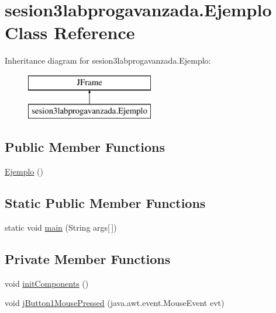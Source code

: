 \hypertarget{classsesion3labprogavanzada_1_1_ejemplo}{}\section{sesion3labprogavanzada.\+Ejemplo Class Reference}
\label{classsesion3labprogavanzada_1_1_ejemplo}
Inheritance diagram for sesion3labprogavanzada.\+Ejemplo\+:\begin{figure}[H]
\begin{center}
\leavevmode
\includegraphics[height=2.000000cm]{classsesion3labprogavanzada_1_1_ejemplo}
\end{center}
\end{figure}
\subsection*{Public Member Functions}
\begin{DoxyCompactItemize}
\item 
\mbox{\hyperlink{classsesion3labprogavanzada_1_1_ejemplo_a8e39fb4b471c241ca4320630761ba9ec}{Ejemplo}} ()
\end{DoxyCompactItemize}
\subsection*{Static Public Member Functions}
\begin{DoxyCompactItemize}
\item 
static void \mbox{\hyperlink{classsesion3labprogavanzada_1_1_ejemplo_a8b28553a42993aa889c34812810e3b9d}{main}} (String args\mbox{[}$\,$\mbox{]})
\end{DoxyCompactItemize}
\subsection*{Private Member Functions}
\begin{DoxyCompactItemize}
\item 
void \mbox{\hyperlink{classsesion3labprogavanzada_1_1_ejemplo_a6a1ce57e4ba1aa142cdd8b608ff05f74}{init\+Components}} ()
\item 
void \mbox{\hyperlink{classsesion3labprogavanzada_1_1_ejemplo_a2718c3cd0a04e4a09a5bb6a2252807ad}{j\+Button1\+Mouse\+Pressed}} (java.\+awt.\+event.\+Mouse\+Event evt)
\end{DoxyCompactItemize}
